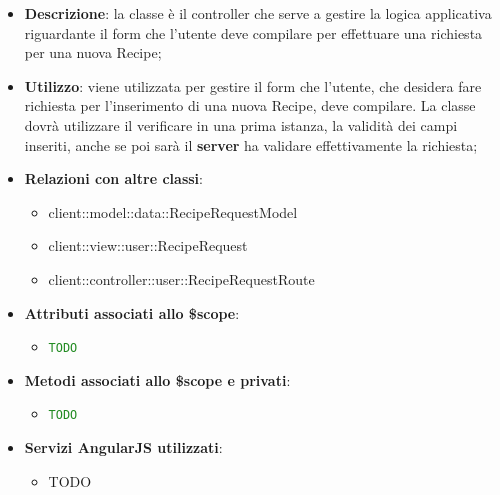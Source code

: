 			\begin{itemize}
				\item \textbf{Descrizione}: la classe è il controller che serve a gestire la logica applicativa riguardante il form che l'utente deve compilare per effettuare una richiesta per una nuova Recipe;
				\item \textbf{Utilizzo}: viene utilizzata per gestire il form che l'utente, che desidera fare richiesta per l'inserimento di una nuova Recipe, deve compilare. La classe dovrà utilizzare il verificare in una prima istanza, la validità dei campi inseriti, anche se poi sarà il \textbf{server} ha validare effettivamente la richiesta;
				\item \textbf{Relazioni con altre classi}:
					\begin{itemize}
						\item client::model::data::RecipeRequestModel
						\item client::view::user::RecipeRequest
						\item client::controller::user::RecipeRequestRoute
					\end{itemize}

				\item \textbf{Attributi associati allo \$scope}:
					\begin{itemize}
						\item \textcolor{forestgreen}{\texttt{TODO}}

					\end{itemize}

				\item \textbf{Metodi associati allo \$scope e privati}:
					\begin{itemize}
						\item \textcolor{forestgreen}{\texttt{TODO}}

					\end{itemize}

				\item \textbf{Servizi AngularJS utilizzati}:
					\begin{itemize}
						\item TODO
					\end{itemize}

			\end{itemize}


